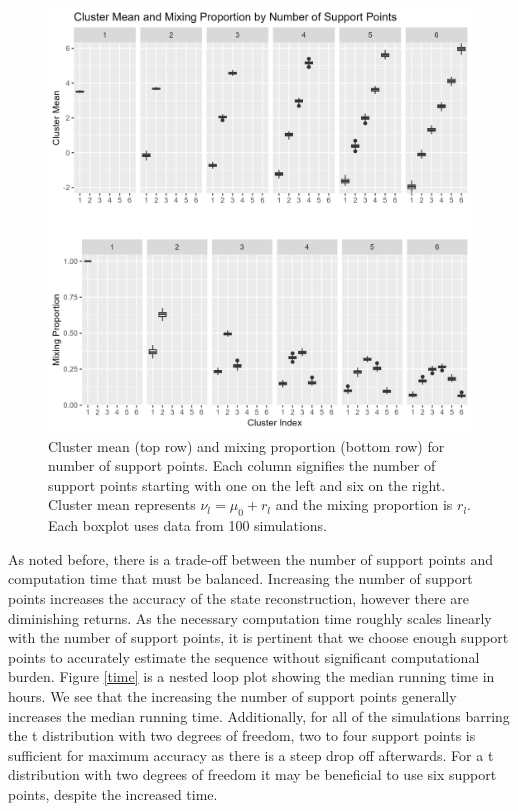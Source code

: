 \documentclass{article}
\begin{document}
\begin{figure}
\includegraphics[scale=.48]{Support/clustmeanmix.png}
\centering
\caption{Cluster mean (top row) and mixing proportion (bottom row) 
for number of support points. Each column signifies the number 
of support points starting with one on the left and six on the right. 
Cluster mean represents $\nu_l=\mu_0+r_l$ and the mixing 
proportion is $r_l$. Each boxplot uses data from 100 simulations. }
\label{CMM}
\end{figure}

As noted before, there is a trade-off between the number of 
support points and computation time that must be balanced. 
Increasing the number of support points increases the accuracy 
of the state reconstruction, however there are diminishing returns. 
As the necessary computation time roughly scales linearly with 
the number of support points, it is pertinent that we choose enough 
support points to accurately estimate the sequence without 
significant computational burden. Figure \ref{time} is a nested 
loop plot showing the median running time in hours. We see that 
the increasing the number of support points generally increases 
the median running time. Additionally, for all of the simulations 
barring the t distribution with two degrees of freedom, two to 
four support points is sufficient for maximum accuracy as there 
is a steep drop off afterwards. For a t distribution with two 
degrees of freedom it may be beneficial to use six support points, despite the increased time.
\end{document}
